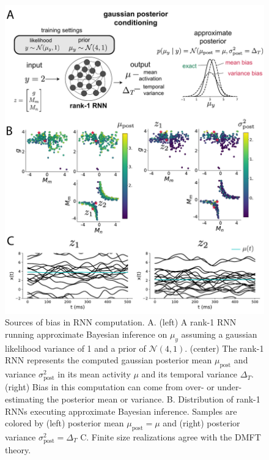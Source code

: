 \documentclass[11pt]{article}
\begin{document}
\begin{figure}
\begin{center}
\includegraphics[scale=0.7]{figures/fig5/fig5.pdf}
\end{center}
\caption{Sources of bias in RNN computation.  A. (left) A rank-1 RNN running approximate Bayesian inference on $\mu_y$ assuming a gaussian likelihood variance of 1 and a prior of $\mathcal{N}(4,1)$.  (center) The rank-1 RNN represents the computed gaussian posterior mean $\mu_{\text{post}}$ and variance $\sigma^2_{\text{post}}$  in its mean activity $\mu$ and its temporal variance $\Delta_T$.  (right) Bias in this computation can come from over- or under-estimating the posterior mean or variance. B. Distribution of rank-1 RNNs executing approximate Bayesian inference.  Samples are colored by (left) posterior mean $\mu_{\text{post}}=\mu$ and (right) posterior variance $\sigma^2_{\text{post}}=\Delta_T$  C. Finite size realizations agree with the DMFT theory.}
\end{figure}
\end{document}
